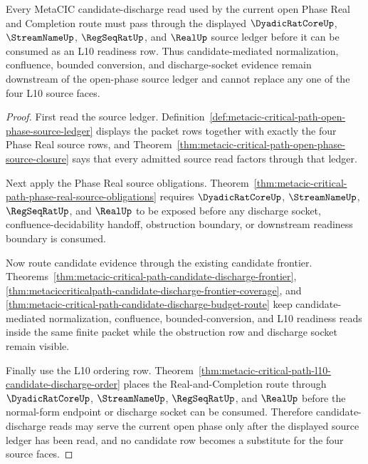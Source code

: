 \begin{theorem}
\label{thm:metacic-critical-path-open-phase-frontier}
Every MetaCIC candidate-discharge read used by the current open Phase Real and Completion route must pass through the displayed $\DyadicRatCoreUp$, $\StreamNameUp$, $\RegSeqRatUp$, and $\RealUp$ source ledger before it can be consumed as an L10 readiness row. Thus candidate-mediated normalization, confluence, bounded conversion, and discharge-socket evidence remain downstream of the open-phase source ledger and cannot replace any one of the four L10 source faces.
\end{theorem}
\begin{proof}
First read the source ledger. Definition~\ref{def:metacic-critical-path-open-phase-source-ledger} displays the packet rows together with exactly the four Phase Real source rows, and Theorem~\ref{thm:metacic-critical-path-open-phase-source-closure} says that every admitted source read factors through that ledger.

Next apply the Phase Real source obligations. Theorem~\ref{thm:metacic-critical-path-phase-real-source-obligations} requires $\DyadicRatCoreUp$, $\StreamNameUp$, $\RegSeqRatUp$, and $\RealUp$ to be exposed before any discharge socket, confluence-decidability handoff, obstruction boundary, or downstream readiness boundary is consumed.

Now route candidate evidence through the existing candidate frontier. Theorems~\ref{thm:metacic-critical-path-candidate-discharge-frontier}, \ref{thm:metaciccriticalpath-candidate-discharge-frontier-coverage}, and \ref{thm:metacic-critical-path-candidate-discharge-budget-route} keep candidate-mediated normalization, confluence, bounded-conversion, and L10 readiness reads inside the same finite packet while the obstruction row and discharge socket remain visible.

Finally use the L10 ordering row. Theorem~\ref{thm:metacic-critical-path-l10-candidate-discharge-order} places the Real-and-Completion route through $\DyadicRatCoreUp$, $\StreamNameUp$, $\RegSeqRatUp$, and $\RealUp$ before the normal-form endpoint or discharge socket can be consumed. Therefore candidate-discharge reads may serve the current open phase only after the displayed source ledger has been read, and no candidate row becomes a substitute for the four source faces.
\end{proof}

